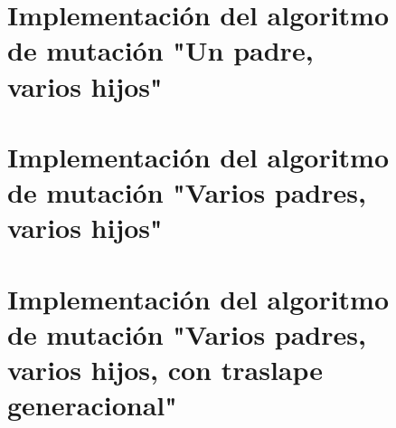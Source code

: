 \documentclass[sigconf,authorversion,nonacm]{acmart}
\begin{document}
\begin{figure}
  \section{Implementación del algoritmo de mutación "Un padre, varios hijos"}
  
\end{figure}

\begin{figure}
  \section{Implementación del algoritmo de mutación "Varios padres, varios hijos"}
  
\end{figure}

\begin{figure}
  \section{Implementación del algoritmo de mutación "Varios padres, varios hijos, con traslape generacional"}
  
\end{figure}
\end{document}
